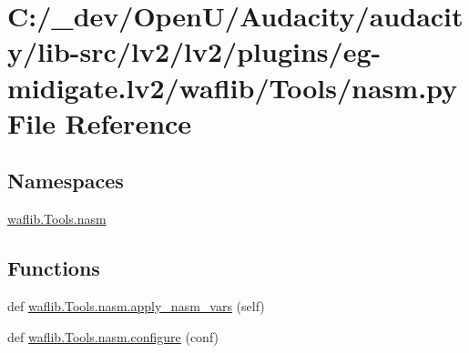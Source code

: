 \hypertarget{lv2_2plugins_2eg-midigate_8lv2_2waflib_2_tools_2nasm_8py}{}\section{C\+:/\+\_\+dev/\+Open\+U/\+Audacity/audacity/lib-\/src/lv2/lv2/plugins/eg-\/midigate.lv2/waflib/\+Tools/nasm.py File Reference}
\label{lv2_2plugins_2eg-midigate_8lv2_2waflib_2_tools_2nasm_8py}
\subsection*{Namespaces}
\begin{DoxyCompactItemize}
\item 
 \hyperlink{namespacewaflib_1_1_tools_1_1nasm}{waflib.\+Tools.\+nasm}
\end{DoxyCompactItemize}
\subsection*{Functions}
\begin{DoxyCompactItemize}
\item 
def \hyperlink{namespacewaflib_1_1_tools_1_1nasm_a43879d6ce11e92cbb0978a352bf863ce}{waflib.\+Tools.\+nasm.\+apply\+\_\+nasm\+\_\+vars} (self)
\item 
def \hyperlink{namespacewaflib_1_1_tools_1_1nasm_aeea053be55b9909c496dfe1a4d62ce68}{waflib.\+Tools.\+nasm.\+configure} (conf)
\end{DoxyCompactItemize}
